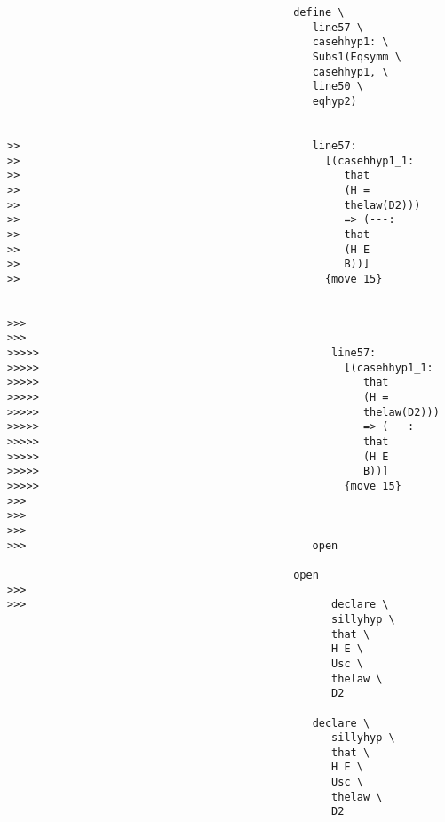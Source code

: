 \documentclass[12pt]{article}
\begin{document}
\begin{verbatim}
                                             define \
                                                line57 \
                                                casehhyp1: \
                                                Subs1(Eqsymm \
                                                casehhyp1, \
                                                line50 \
                                                eqhyp2)


>>                                              line57:
>>                                                [(casehhyp1_1:
>>                                                   that
>>                                                   (H =
>>                                                   thelaw(D2)))
>>                                                   => (---:
>>                                                   that
>>                                                   (H E
>>                                                   B))]
>>                                                {move 15}


>>>
>>>
>>>>>                                              line57:
>>>>>                                                [(casehhyp1_1:
>>>>>                                                   that
>>>>>                                                   (H =
>>>>>                                                   thelaw(D2)))
>>>>>                                                   => (---:
>>>>>                                                   that
>>>>>                                                   (H E
>>>>>                                                   B))]
>>>>>                                                {move 15}
>>>
>>>
>>>
>>>                                             open

                                             open
>>>
>>>                                                declare \
                                                   sillyhyp \
                                                   that \
                                                   H E \
                                                   Usc \
                                                   thelaw \
                                                   D2

                                                declare \
                                                   sillyhyp \
                                                   that \
                                                   H E \
                                                   Usc \
                                                   thelaw \
                                                   D2



\end{verbatim}
\end{document}
